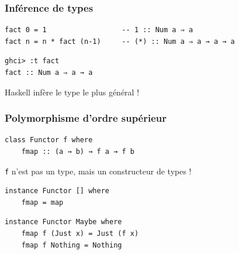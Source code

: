 \documentclass[10pt]{beamer}
\begin{document}
\begin{frame}[fragile]
\frametitle{Inférence de types}

\begin{verbatim}
fact 0 = 1                  -- 1 :: Num a ⇒ a
fact n = n * fact (n-1)     -- (*) :: Num a ⇒ a → a → a
\end{verbatim}
\pause
\begin{verbatim}
ghci> :t fact
fact :: Num a ⇒ a → a
\end{verbatim}

Haskell infère le type le plus général !
\end{frame}



\begin{frame}[fragile]
\frametitle{Polymorphisme d'ordre supérieur}
\begin{verbatim}
class Functor f where
    fmap :: (a → b) → f a → f b
\end{verbatim}
\pause
\verb|f| n'est pas un type, mais un constructeur de types !
\pause
\begin{verbatim}
instance Functor [] where
    fmap = map
\end{verbatim}
\pause
\begin{verbatim}
instance Functor Maybe where
    fmap f (Just x) = Just (f x)
    fmap f Nothing = Nothing
\end{verbatim}
\end{frame}
\end{document}
